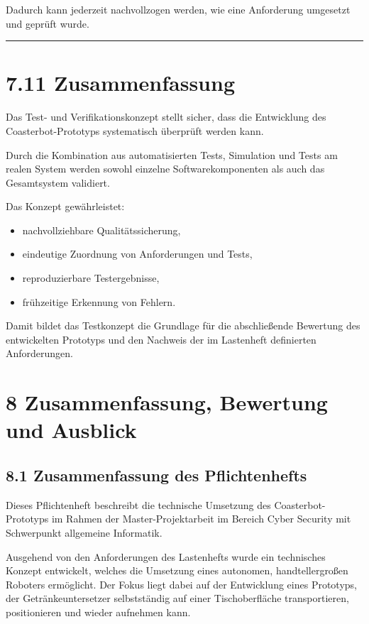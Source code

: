 \documentclass[
]{article}
\providecommand{\tightlist}{%
  \setlength{\itemsep}{0pt}\setlength{\parskip}{0pt}}
\begin{document}
Dadurch kann jederzeit nachvollzogen werden, wie eine Anforderung
umgesetzt und geprüft wurde.

\begin{center}\rule{0.5\linewidth}{0.5pt}\end{center}

\section{7.11 Zusammenfassung}\label{zusammenfassung-5}

Das Test- und Verifikationskonzept stellt sicher, dass die Entwicklung
des Coasterbot-Prototyps systematisch überprüft werden kann.

Durch die Kombination aus automatisierten Tests, Simulation und Tests am
realen System werden sowohl einzelne Softwarekomponenten als auch das
Gesamtsystem validiert.

Das Konzept gewährleistet:

\begin{itemize}
\tightlist
\item
  nachvollziehbare Qualitätssicherung,
\item
  eindeutige Zuordnung von Anforderungen und Tests,
\item
  reproduzierbare Testergebnisse,
\item
  frühzeitige Erkennung von Fehlern.
\end{itemize}

Damit bildet das Testkonzept die Grundlage für die abschließende
Bewertung des entwickelten Prototyps und den Nachweis der im Lastenheft
definierten Anforderungen.

\section{8 Zusammenfassung, Bewertung und
Ausblick}\label{zusammenfassung-bewertung-und-ausblick}

\subsection{8.1 Zusammenfassung des
Pflichtenhefts}\label{zusammenfassung-des-pflichtenhefts}

Dieses Pflichtenheft beschreibt die technische Umsetzung des
Coasterbot-Prototyps im Rahmen der Master-Projektarbeit im Bereich Cyber
Security mit Schwerpunkt allgemeine Informatik.

Ausgehend von den Anforderungen des Lastenhefts wurde ein technisches
Konzept entwickelt, welches die Umsetzung eines autonomen,
handtellergroßen Roboters ermöglicht. Der Fokus liegt dabei auf der
Entwicklung eines Prototyps, der Getränkeuntersetzer selbstständig auf
einer Tischoberfläche transportieren, positionieren und wieder aufnehmen
kann.
\end{document}
